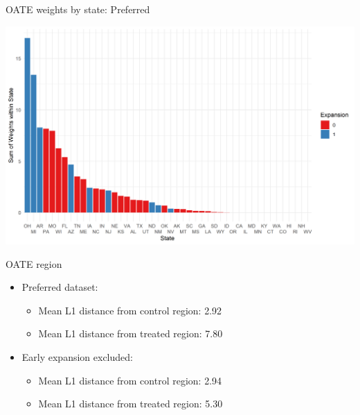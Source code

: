 \documentclass[hyperref={pdfpagelabels=false}]{beamer}
\begin{document}
\begin{frame}{OATE weights by state: Preferred}
    \begin{center}
	\includegraphics[scale=0.5]{01_Plots/oate-region-c1-a.png}
    \end{center}
\end{frame}

\begin{frame}{OATE region}
    \begin{itemize}
        \item Preferred dataset: \bigskip
        \begin{itemize}
            \item Mean L1 distance from control region: 2.92 \bigskip
            \item Mean L1 distance from treated region: 7.80 \bigskip
        \end{itemize}
        \item Early expansion excluded: \bigskip
        \begin{itemize}
            \item Mean L1 distance from control region: 2.94 \bigskip
            \item Mean L1 distance from treated region: 5.30 \bigskip
        \end{itemize}
    \end{itemize}
\end{frame}
\end{document}
